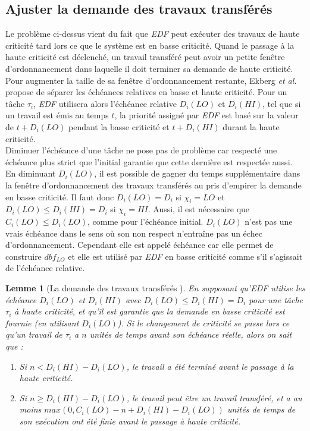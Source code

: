 \documentclass[12pt,a4paper,oneside]{book}
\theoremstyle{break}
\theoremstyle{breakplain}
\newtheorem{lem}{Lemme}[chapter]
\begin{document}
\subsection{Ajuster la demande des travaux transférés}

Le problème ci-dessus vient du fait que \textit{EDF} peut exécuter des travaux de haute criticité tard lors ce que le système est en basse criticité. Quand le passage à la haute criticité est déclenché, un travail transféré peut avoir un petite fenêtre d'ordonnancement dans laquelle il doit terminer sa demande de haute criticité. Pour augmenter la taille de sa fenêtre d'ordonnancement restante, Ekberg \textit{et al.} propose de séparer les échéances relatives en basse et haute criticité. Pour un tâche $\tau_i$, \textit{EDF} utilisera alors l'échéance relative $D_i(LO)$ et $D_i(HI)$, tel que si un travail est émis au temps $t$, la priorité assigné par \textit{EDF} est basé sur la valeur de $t+D_i(LO)$ pendant la basse criticité et $t+D_i(HI)$ durant la haute criticité.\\

Diminuer l'échéance d'une tâche ne pose pas de problème car respecté une échéance plus strict que l'initial garantie que cette dernière est respectée aussi. En diminuant $D_i(LO)$, il est possible de gagner du temps supplémentaire dans la fenêtre d'ordonnancement des travaux transférés au pris d'empirer la demande en basse criticité. Il faut donc $D_i(LO) = D_i$ si $\chi_i = LO$ et $D_i(LO) \le D_i(HI) = D_i$ si $\chi_i = HI$. Aussi, il est nécessaire que $C_i(LO) \le D_i(LO)$, comme pour l'échéance initial. $D_i(LO)$ n'est pas une vrais échéance dans le sens où son non respect n'entraîne pas un échec d'ordonnancement. Cependant elle est appelé échéance car elle permet de construire $dbf_{LO}$ et elle est utilisé par \textit{EDF} en basse criticité comme s'il s'agissait de l'échéance relative.

\begin{lem}[La demande des travaux transférés \cite{ekberg2014bounding}]
\label{greedy:dtt}
En supposant qu'\textit{EDF} utilise les échéance $D_i(LO)$ et $D_i(HI)$ avec $D_i(LO) \le D_i(HI) = D_i$ pour une tâche $\tau_i$ à haute criticité, et qu'il est garantie que la demande en basse criticité est fournie (en utilisant $D_i(LO)$). Si le changement de criticité se passe lors ce qu'un travail de $\tau_i$ a $n$ unités de temps avant son échéance réelle, alors on sait que :

\begin{enumerate}
\item  Si $n < D_i(HI) - D_i(LO)$, le travail a été terminé avant le passage à la haute criticité.
\item Si $n \ge D_i(HI)-D_i(LO)$, le travail peut être un travail transféré, et a au moins $max \left(0, C_i(LO) - n + D_i(HI) - D_i(LO)\right)$ unités de temps de son exécution ont été finie avant le passage à haute criticité.
\end{enumerate}
\end{lem}
\end{document}
